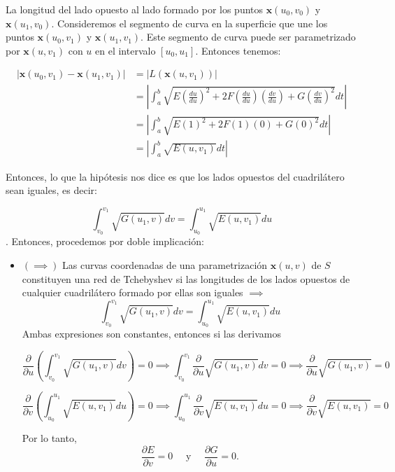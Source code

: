\begin{problema}
\begin{enumerate}
\begin{dem}
\begin{itemize}
    La longitud del lado opuesto al lado formado por los puntos $\mathbf{x}(u_0,v_0)$ y $\mathbf{x}(u_1,v_0)$.  Consideremos el segmento de curva en la superficie que une los puntos $\mathbf{x}(u_0,v_1)$ y $\mathbf{x}(u_1,v_1)$. Este segmento de curva puede ser parametrizado por $\mathbf{x}(u,v_1)$ con $u$ en el intervalo $[u_0,u_1]$. Entonces tenemos: 
    

    \begin{align*}|\mathbf{x}(u_0,v_1) - \mathbf{x}(u_1,v_1)| &= |L(\mathbf{x}(u,v_1))|\\
        &= \left|\int_a^b \sqrt{E\left(\frac{du}{du}\right)^2 + 2F\left(\frac{du}{du}\right)\left(\frac{dv}{du}\right) +G\left(\frac{dv}{du}\right)^2}dt\right|\\
        &= \left|\int_a^b \sqrt{E\left(1\right)^2 + 2F\left(1\right)\left(0\right) +G\left(0\right)^2}dt\right|\\
        &= \left|\int_a^b \sqrt{E(u,v_1)}dt\right|
    \end{align*}
\end{itemize}

Entonces, lo que la hipótesis nos dice es que los lados opuestos del cuadrilátero sean iguales, es decir:

$$ \int_{v_0}^{v_1} \sqrt{G(u_1,v)}dv = \int_{u_0}^{u_1} \sqrt{E(u,v_1)}du $$. 
Entonces, procedemos por doble implicación: 

\begin{itemize}
    \item $(\implies)$  Las curvas coordenadas de una parametrización $\mathbf{x}(u, v)$ de $S$ constituyen una red de Tchebyshev si las longitudes de los lados opuestos de cualquier cuadrilátero formado por ellas son iguales $\implies$ 
    $$ \int_{v_0}^{v_1} \sqrt{G(u_1,v)}dv = \int_{u_0}^{u_1} \sqrt{E(u,v_1)}du $$
    Ambas expresiones son constantes, entonces si las derivamos 

    $$ \frac{\partial}{\partial u}\left(\int_{v_0}^{v_1} \sqrt{G(u_1,v)}dv\right) = 0 \implies \int_{v_0}^{v_1} \frac{\partial}{\partial u}\sqrt{G(u_1,v)}dv = 0 \implies \frac{\partial}{\partial u}\sqrt{G(u_1,v)} = 0 $$


$$ \frac{\partial}{\partial v}\left(\int_{u_0}^{u_1} \sqrt{E(u,v_1)}du\right) = 0 \implies  \int_{u_0}^{u_1} \frac{\partial}{\partial v}\sqrt{E(u,v_1)}du = 0 \implies  \frac{\partial}{\partial v}\sqrt{E(u,v_1)} = 0$$

Por lo tanto, 
$$
        \frac{\partial E}{\partial v}=0 \quad \text { y } \quad \frac{\partial G}{\partial u}=0.
        $$


\end{itemize}
\end{dem}
\end{enumerate}
\end{problema}
